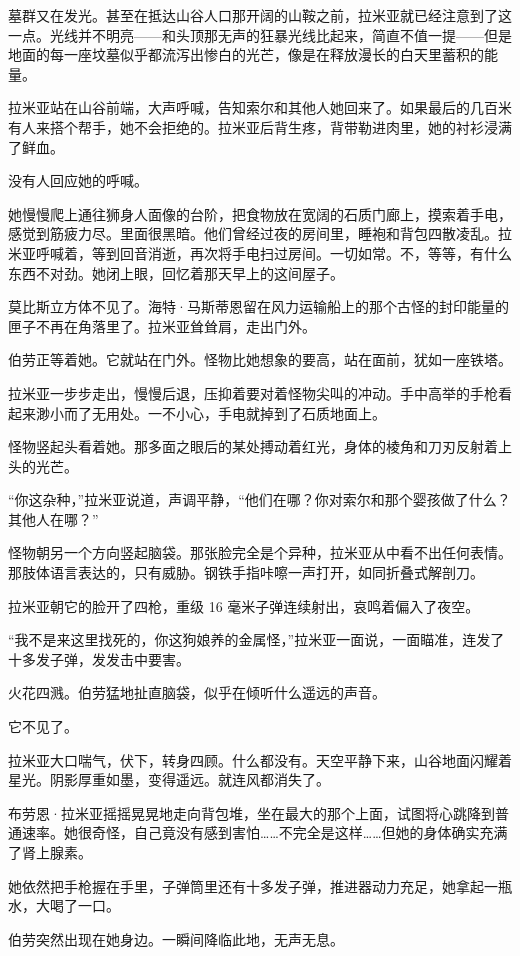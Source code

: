 \documentclass[AutoFakeBold=true]{book}
\begin{document}
墓群又在发光。甚至在抵达山谷人口那开阔的山鞍之前，拉米亚就已经注意到了这一点。光线并不明亮——和头顶那无声的狂暴光线比起来，简直不值一提——但是地面的每一座坟墓似乎都流泻出惨白的光芒，像是在释放漫长的白天里蓄积的能量。

拉米亚站在山谷前端，大声呼喊，告知索尔和其他人她回来了。如果最后的几百米有人来搭个帮手，她不会拒绝的。拉米亚后背生疼，背带勒进肉里，她的衬衫浸满了鲜血。

没有人回应她的呼喊。

她慢慢爬上通往狮身人面像的台阶，把食物放在宽阔的石质门廊上，摸索着手电，感觉到筋疲力尽。里面很黑暗。他们曾经过夜的房间里，睡袍和背包四散凌乱。拉米亚呼喊着，等到回音消逝，再次将手电扫过房间。一切如常。不，等等，{\kaishu 有什么东西}不对劲。她闭上眼，回忆着那天早上的这间屋子。

莫比斯立方体不见了。海特·马斯蒂恩留在风力运输船上的那个古怪的封印能量的匣子不再在角落里了。拉米亚耸耸肩，走出门外。

伯劳正等着她。它就站在门外。怪物比她想象的要高，站在面前，犹如一座铁塔。

拉米亚一步步走出，慢慢后退，压抑着要对着怪物尖叫的冲动。手中高举的手枪看起来渺小而了无用处。一不小心，手电就掉到了石质地面上。

怪物竖起头看着她。那多面之眼后的某处搏动着红光，身体的棱角和刀刃反射着上头的光芒。

``你这杂种，''拉米亚说道，声调平静，``他们在哪？你对索尔和那个婴孩做了什么？其他人在哪？''

怪物朝另一个方向竖起脑袋。那张脸完全是个异种，拉米亚从中看不出任何表情。那肢体语言表达的，只有威胁。钢铁手指咔嚓一声打开，如同折叠式解剖刀。

拉米亚朝它的脸开了四枪，重级 16 毫米子弹连续射出，哀鸣着偏入了夜空。

``我不是来这里找死的，你这狗娘养的金属怪，''拉米亚一面说，一面瞄准，连发了十多发子弹，发发击中要害。

火花四溅。伯劳猛地扯直脑袋，似乎在倾听什么遥远的声音。

它不见了。

拉米亚大口喘气，伏下，转身四顾。什么都没有。天空平静下来，山谷地面闪耀着星光。阴影厚重如墨，变得遥远。就连风都消失了。

布劳恩·拉米亚摇摇晃晃地走向背包堆，坐在最大的那个上面，试图将心跳降到普通速率。她很奇怪，自己竟没有感到害怕……不完全是这样……但她的身体确实充满了肾上腺素。

她依然把手枪握在手里，子弹筒里还有十多发子弹，推进器动力充足，她拿起一瓶水，大喝了一口。

伯劳突然出现在她身边。一瞬间降临此地，无声无息。
\end{document}
